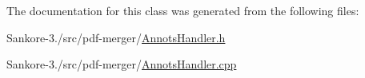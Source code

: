 The documentation for this class was generated from the following files\-:\begin{DoxyCompactItemize}
\item 
Sankore-\/3./src/pdf-\/merger/\hyperlink{_annots_handler_8h}{Annots\-Handler.\-h}\item 
Sankore-\/3./src/pdf-\/merger/\hyperlink{_annots_handler_8cpp}{Annots\-Handler.\-cpp}\end{DoxyCompactItemize}
